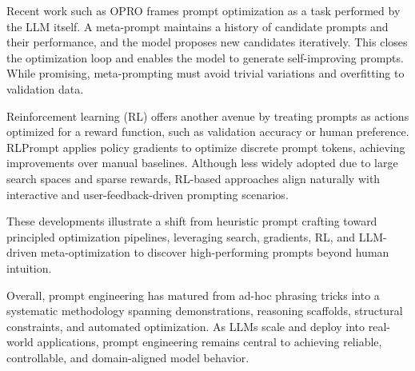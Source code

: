 Recent work such as OPRO \cite{yao2023opro} frames prompt optimization as a task performed by the LLM itself. A meta-prompt maintains a history of candidate prompts and their performance, and the model proposes new candidates iteratively. This closes the optimization loop and enables the model to generate self-improving prompts. While promising, meta-prompting must avoid trivial variations and overfitting to validation data.

Reinforcement learning (RL) offers another avenue by treating prompts as actions optimized for a reward function, such as validation accuracy or human preference. RLPrompt \cite{deng2022rlprompt} applies policy gradients to optimize discrete prompt tokens, achieving improvements over manual baselines. Although less widely adopted due to large search spaces and sparse rewards, RL-based approaches align naturally with interactive and user-feedback-driven prompting scenarios.

These developments illustrate a shift from heuristic prompt crafting toward principled optimization pipelines, leveraging search, gradients, RL, and LLM-driven meta-optimization to discover high-performing prompts beyond human intuition.

Overall, prompt engineering has matured from ad-hoc phrasing tricks into a systematic methodology spanning demonstrations, reasoning scaffolds, structural constraints, and automated optimization. As LLMs scale and deploy into real-world applications, prompt engineering remains central to achieving reliable, controllable, and domain-aligned model behavior.

\newpage
